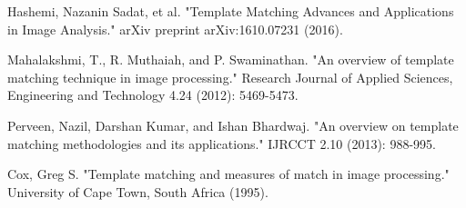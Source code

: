 \cleardoublepage
{}
{}
\begin{thebibliography}{99}

Hashemi, Nazanin Sadat, et al. "Template Matching Advances and Applications in Image Analysis." arXiv preprint arXiv:1610.07231 (2016).


Mahalakshmi, T., R. Muthaiah, and P. Swaminathan. "An overview of template matching technique in image processing." Research Journal of Applied Sciences, Engineering and Technology 4.24 (2012): 5469-5473.

Perveen, Nazil, Darshan Kumar, and Ishan Bhardwaj. "An overview on template matching methodologies and its applications." IJRCCT 2.10 (2013): 988-995.

Cox, Greg S. "Template matching and measures of match in image processing." University of Cape Town, South Africa (1995).

\end{thebibliography}
